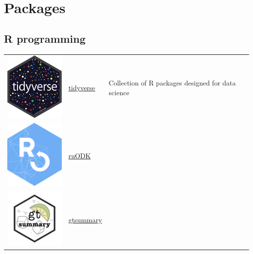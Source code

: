 \documentclass[
  letterpaper,
  DIV=11,
  numbers=noendperiod,
  oneside]{scrreprt}
\begin{document}
\hypertarget{packages-1}{%
\section{Packages}\label{packages-1}}

\hypertarget{r-programming-3}{%
\subsection{R programming}\label{r-programming-3}}

\begin{longtable}[]{@{}
  >{\raggedright\arraybackslash}p{}
  >{\raggedright\arraybackslash}p{}
  >{\raggedright\arraybackslash}p{}@{}}
\toprule()
\endhead
\includegraphics[width=1.30208in,height=\textheight]{./images/tidyverse-logo.png}
& \href{https://www.tidyverse.org/}{tidyverse} & Collection of R
packages designed for data science \\
\includegraphics[width=1.30208in,height=\textheight]{./images/logo.png}
& \href{https://docs.ropensci.org/ruODK/index.html}{ruODK} & \\
\includegraphics[width=1.30208in,height=\textheight]{./images/logo-01.png}
& \href{https://www.danieldsjoberg.com/gtsummary/}{gtsummary} & \\

\end{longtable}
\end{document}
